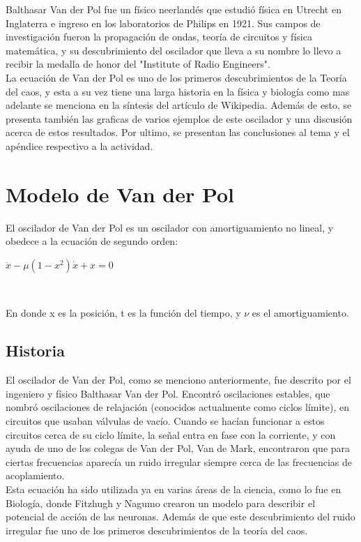 \documentclass[12pt]{article}
\begin{document}
Balthasar Van der Pol fue un físico neerlandés que estudió física en Utrecht en Inglaterra e ingreso en los laboratorios de Philips en 1921. Sus campos de investigación fueron la propagación de ondas, teoría de circuitos y física matemática, y su descubrimiento del oscilador que lleva a su nombre lo llevo a recibir la medalla de honor del "Institute of Radio Engineers". \\

La ecuación de Van der Pol es uno de los primeros descubrimientos de la Teoría del caos, y esta a su vez tiene una larga historia en la física y biología como mas adelante se menciona en la síntesis del artículo de Wikipedia. Además de esto, se presenta también las graficas de varios ejemplos de este oscilador y una discusión acerca de estos resultados. Por ultimo, se presentan las conclusiones al tema y el apéndice respectivo a la actividad.

\section{Modelo de Van der Pol}
El oscilador de Van der Pol es un oscilador con amortiguamiento no lineal, y obedece a la ecuación de segundo orden:

\centerline{$ \ddot x -\mu (1-x^2) \dot x +x = 0$}
$    $

En donde x es la posición, t es la función del tiempo, y $\nu$ es el amortiguamiento.

\subsection{Historia}
El oscilador de Van der Pol, como se menciono anteriormente, fue descrito por el ingeniero y físico Balthasar Van der Pol. Encontró oscilaciones estables, que nombró oscilaciones de relajación (conocidos actualmente como ciclos límite), en circuitos que usaban válvulas de vacío. Cuando se hacían funcionar a estos circuitos cerca de su ciclo límite, la señal entra en fase con la corriente, y con ayuda de uno de los colegas de Van der Pol, Van de Mark, encontraron que para ciertas frecuencias aparecía un ruido irregular siempre cerca de las frecuencias de acoplamiento. \\

Esta ecuación ha sido utilizada ya en varias áreas de la ciencia, como lo fue en Biología, donde Fitzhugh  y Nagumo crearon un modelo para describir el potencial de acción de las neuronas. Además de que este descubrimiento del ruido irregular fue uno de los primeros descubrimientos de la teoría del caos. 
\end{document}
